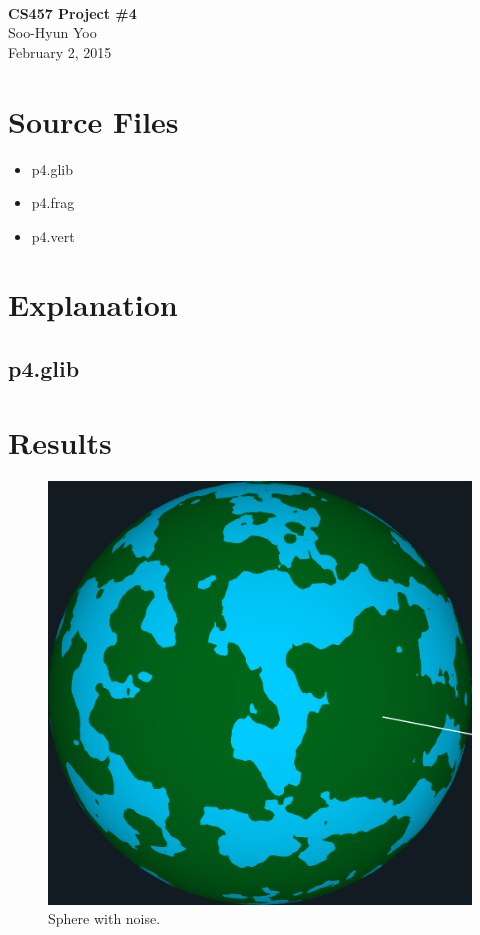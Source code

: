 \documentclass[12pt,letterpaper]{article}
\begin{document}
\fancyfoot{}
\begin{center}
    \hfill \\
    \vspace{4in}
    {\bf\Huge CS457 Project \#4 \\}
    \vspace{2in}
    {\Large Soo-Hyun Yoo \\ February 2, 2015}
\end{center}

\newpage
{}

\section*{Source Files}

\begin{itemize}
    \item p4.glib
    \item p4.frag
    \item p4.vert
\end{itemize}


\section*{Explanation}

\subsection*{p4.glib}


\newpage
\section*{Results}

\begin{figure}[!h]
    \centering
    \includegraphics[width=1.0\textwidth]{img/sphere_noise.png}
    \caption{Sphere with noise.}
    \label{fig:spherenoise}
\end{figure}
\end{document}
